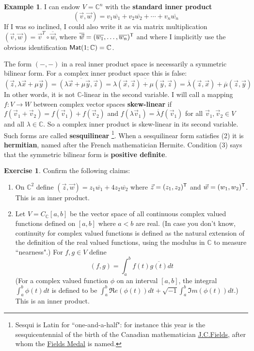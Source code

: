 \documentclass[11pt]{amsbook}
\theoremstyle{definition}
\newtheorem{ex}[theorem]{Example}
\newtheorem{exercise}{Exercise}
\begin{document}
\begin{ex} \label{standardcomp}
I can endow $V = \mathbb{C}^n$ with the {\bf standard inner product} $$(\vec{v}, \vec{w}) = v_1\overline{w_1} + v_2\overline{w_2} + \cdots + v_n\overline{w_n}$$ If I was so inclined, I could also write it as via matrix multiplication $(\vec{v}, \vec{w}) = \vec{v}^T \circ \overline{\vec{w}}$, where $\overline{\vec{w}} = (\overline{w_1}, \ldots , \overline{w_n})^{\sf T}$ and where I implicitly use the obvious identification ${\sf Mat}(1; \mathbb{C}) = \mathbb{C}$.
\end{ex}

The form $(-, -)$ in a real inner product space is necessarily a symmetric bilinear form. For a complex inner product space this is false: $$(\vec{z}, \lambda \vec{x} + \mu \vec{y}) = \overline{(\lambda \vec{x} + \mu \vec{y}, \vec{z})} =   \overline{\lambda (\vec{x}, \vec{z}) + \mu (\vec{y}, \vec{z})} =  \overline{\lambda} (\vec{z}, \vec{x}) + \overline{\mu} (\vec{z}, \vec{y})$$ In other words, it is not $\mathbb{C}$-linear in the second variable.  I will call a mapping $f:V \to W$ between complex vector spaces {\bf skew-linear} if $f(\vec{v}_1+\vec{v}_2) = f(\vec{v}_1) + f(\vec{v}_2)$ and $f(\lambda\vec{v}_1) = \overline{\lambda}f(\vec{v}_1)$ for all $\vec{v}_1, \vec{v}_2 \in V$ and all $\lambda \in \mathbb{C}$. So a complex inner product is skew-linear in its second variable. Such forms are called {\bf sesquilinear} \footnote{Sesqui is Latin for ``one-and-a-half": for instance this year is the sesquicentennial of the birth of the Canadian mathematician \href{http://en.wikipedia.org/wiki/John_Charles_Fields}{J.C.Fields}, after whom the \href{http://en.wikipedia.org/wiki/Fields_Medal}{Fields Medal} is named.}. When a sesquilinear form satisfies (2) it is {\bf hermitian}, named after the French mathematician Hermite. Condition (3) says that the symmetric bilinear form is {\bf positive definite}.

\begin{exercise} \label{intcom} Confirm the following claims:
\begin{enumerate}
\item On $\mathbb{C}^2$ define $(\vec{z}, \vec{w}) = z_1 \overline{w_1} + 4z_2\overline{w_2}$ where $\vec{z} = (z_1, z_2)^{\sf T}$ and $\vec{w} = (w_1, w_2)^{\sf T}$. This is an inner product.
\item Let $V = C_{\mathbb{C}}[a,b]$ be the vector space of all continuous complex valued functions defined on $[a,b]$ where $a<b$ are real. (In case you don't know, continuity for complex valued functions is defined as the natural extension of the definition of the real valued functions, using the modulus in $\mathbb{C}$ to measure ``nearness".) For $f, g\in V$ define $$(f,g) = \int_a^b f(t)\overline{g(t)} dt$$ (For a complex valued function $\phi$ on an interval $[a,b]$, the integral $\int_a^b \phi(t)dt$ is defined to be $\int_a^b \mathfrak{R}e (\phi(t)) dt + \sqrt{-1} \int_a^b \mathfrak{I}m (\phi(t))dt.$) This is an inner product.
\end{enumerate}
\end{exercise}
\end{document}
